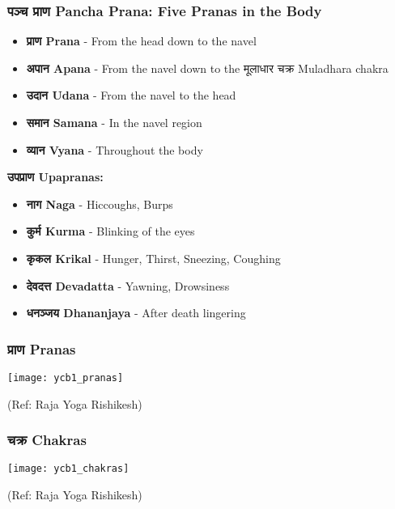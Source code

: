 \begin{frame}[fragile]\frametitle{पञ्च  प्राण  Pancha Prana: Five Pranas in the Body}
    \begin{itemize}
        \item \textbf{प्राण Prana } - From the head down to the navel
        \item \textbf{अपान Apana} - From the navel down to the मूलाधार  चक्र  Muladhara chakra
        \item \textbf{उदान Udana} - From the navel to the head
        \item \textbf{समान Samana} - In the navel region
        \item \textbf{व्यान Vyana} - Throughout the body
    \end{itemize}
    \vspace{0.5cm}
    \textbf{उपप्राण Upapranas:}
    \begin{itemize}
        \item \textbf{नाग  Naga} - Hiccoughs, Burps
        \item \textbf{कुर्म  Kurma} - Blinking of the eyes
        \item \textbf{कृकल Krikal} - Hunger, Thirst, Sneezing, Coughing
        \item \textbf{देवदत्त Devadatta} - Yawning, Drowsiness
        \item \textbf{धनञ्जय Dhananjaya} - After death lingering
    \end{itemize}
\end{frame}

\begin{frame}[fragile]\frametitle{प्राण Pranas}
        \begin{center}
        \texttt{[image: ycb1\_pranas]}
				
		{\tiny (Ref: Raja Yoga Rishikesh)}	 
        \end{center}	

\end{frame}
\begin{frame}[fragile]\frametitle{चक्र  Chakras}
        \begin{center}
        \texttt{[image: ycb1\_chakras]}
				
		{\tiny (Ref: Raja Yoga Rishikesh)}	 
        \end{center}	

\end{frame}

